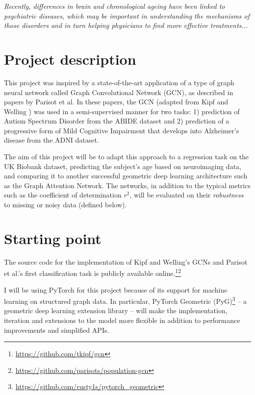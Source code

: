 \documentclass[12pt,a4paper,twoside]{article}
\begin{document}
\textit{Recently, differences in brain and chronological ageing have been linked to psychiatric diseases\cite{kaufmann2019}, which may be important in understanding the mechanisms of those disorders and in turn helping physicians to find more effective treatments...}

\section*{Project description}
This project was inspired by a state-of-the-art application of a type of graph neural network called Graph Convolutional Network (GCN), as described in papers by Parisot et al. \cite{parisot2017spectral, parisot2018disease} In these papers, the GCN (adapted from Kipf and Welling \cite{kipf2017semi}) was used in a semi-supervised manner for two tasks: 1) prediction of Autism Spectrum Disorder from the ABIDE dataset and 2) prediction of a progressive form of Mild Cognitive Impairment that develops into Alzheimer's disease from the ADNI dataset.

The aim of this project will be to adapt this approach to a regression task on the UK Biobank dataset, predicting the subject's age based on neuroimaging data, and comparing it to another successful geometric deep learning architecture such as the Graph Attention Network.\cite{velickovic2018graph} The networks, in addition to the typical metrics such as the coefficient of determination $r^2$, will be evaluated on their \textit{robustness} to missing or noisy data (defined below).

\section*{Starting point}

The source code for the implementation of Kipf and Welling's \cite{kipf2017semi} GCNs and Parisot et al.'s \cite{parisot2018disease} first classification task is publicly available online.\footnote{\url{https://github.com/tkipf/gcn}}\footnote{\url{https://github.com/parisots/population-gcn}}

I will be using PyTorch for this project because of its support for machine learning on structured graph data. In particular, PyTorch Geometric (PyG)\footnote{\url{https://github.com/rusty1s/pytorch_geometric}} – a geometric deep learning extension library – will make the implementation, iteration and extensions to the model more flexible in addition to performance improvements and simplified APIs.
\end{document}
